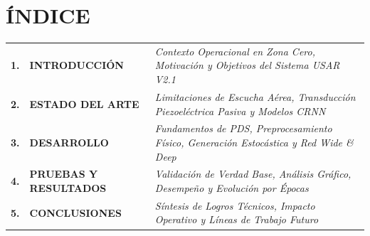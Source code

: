 \documentclass[11pt, a4paper]{article}
\begin{document}
\section*{ÍNDICE}

\noindent
\renewcommand{\arraystretch}{1.8}
\begin{tabular}{@{}p{0.8cm}p{5.2cm}p{8.8cm}@{}}
    \toprule
    \textbf{1.} & \textbf{INTRODUCCIÓN} & \textit{Contexto Operacional en Zona Cero, Motivación y Objetivos del Sistema USAR V2.1} \\
    \textbf{2.} & \textbf{ESTADO DEL ARTE} & \textit{Limitaciones de Escucha Aérea, Transducción Piezoeléctrica Pasiva y Modelos CRNN} \\
    \textbf{3.} & \textbf{DESARROLLO} & \textit{Fundamentos de PDS, Preprocesamiento Físico, Generación Estocástica y Red Wide \& Deep} \\
    \textbf{4.} & \textbf{PRUEBAS Y RESULTADOS} & \textit{Validación de Verdad Base, Análisis Gráfico, Desempeño y Evolución por Épocas} \\
    \textbf{5.} & \textbf{CONCLUSIONES} & \textit{Síntesis de Logros Técnicos, Impacto Operativo y Líneas de Trabajo Futuro} \\
    \bottomrule
\end{tabular}
\renewcommand{\arraystretch}{1.0}

\vspace{0.6cm}
\tableofcontents
\newpage

\end{document}
